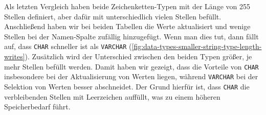 Als letzten Vergleich haben beide Zeichenketten-Typen mit der Länge von 255 Stellen definiert, aber dafür mit unterschiedlich vielen Stellen befüllt.
Anschließend haben wir bei beiden Tabellen die Werte aktualisiert und wenige Stellen bei der Namen-Spalte zufällig hinzugefügt.
Wenn man dies tut, dann fällt auf, dass \texttt{CHAR} schneller ist als \texttt{VARCHAR} (\ref{fig:data-types-smaller-string-type-length-writes}).
Zusätzlich wird der Unterschied zwischen den beiden Typen größer, je mehr Stellen befüllt werden.
Damit haben wir gezeigt, dass die Vorteile von \texttt{CHAR} insbesondere bei der Aktualisierung von Werten liegen, während \texttt{VARCHAR} bei der Selektion von Werten besser abschneidet.
Der Grund hierfür ist, dass \texttt{CHAR} die verbleibenden Stellen mit Leerzeichen auffüllt, was zu einem höheren Speicherbedarf führt.